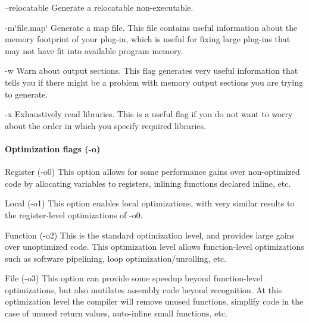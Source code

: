\begin{DoxyItemize}
\item {\ttfamily –relocatable}  Generate a relocatable non-\/executable.  


\item {\ttfamily -\/m\char`\"{}file.\+map\char`\"{}}  Generate a map file. This file contains useful information about the memory footprint of your plug-\/in, which is useful for fixing large plug-\/ins that may not have fit into available program memory.  


\item {\ttfamily -\/w}  Warn about output sections. This flag generates very useful information that tells you if there might be a problem with memory output sections you are trying to generate.  


\item {\ttfamily -\/x}  Exhaustively read libraries. This is a useful flag if you do not want to worry about the order in which you specify required libraries.  


\end{DoxyItemize}

\hypertarget{a00362_subsubsection__optimization_flags_o_}{}\paragraph{Optimization flags (-\/o)}\label{a00362_subsubsection__optimization_flags_o_}
 
\begin{DoxyItemize}
\item Register ({\ttfamily -\/o0})  This option allows for some performance gains over non-\/optimized code by allocating variables to registers, inlining functions declared inline, etc.  


\item Local ({\ttfamily -\/o1})  This option enables local optimizations, with very similar results to the register-\/level optimizations of -\/o0.  


\item Function ({\ttfamily -\/o2})  This is the standard optimization level, and provides large gains over unoptimized code. This optimization level allows function-\/level optimizations such as software pipelining, loop optimization/unrolling, etc.  


\item File (-\/{\ttfamily o3})  This option can provide some speedup beyond function-\/level optimizations, but also mutilates assembly code beyond recognition. At this optimization level the compiler will remove unused functions, simplify code in the case of unused return values, auto-\/inline small functions, etc.  


\end{DoxyItemize}

